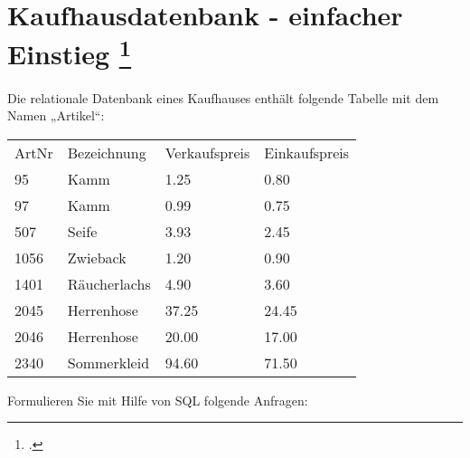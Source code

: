 \documentclass{lehramt-informatik-aufgabe}
\begin{document}
\section{Kaufhausdatenbank - einfacher Einstieg
\footcite{db:ab:2}
}

Die relationale Datenbank eines Kaufhauses enthält folgende Tabelle mit
dem Namen „Artikel“:

\begin{tabular}{llll}
ArtNr & Bezeichnung  & Verkaufspreis & Einkaufspreis \\
95    & Kamm         & 1.25          & 0.80          \\
97    & Kamm         & 0.99          & 0.75          \\
507   & Seife        & 3.93          & 2.45          \\
1056  & Zwieback     & 1.20          & 0.90          \\
1401  & Räucherlachs & 4.90          & 3.60          \\
2045  & Herrenhose   & 37.25         & 24.45         \\
2046  & Herrenhose   & 20.00         & 17.00         \\
2340  & Sommerkleid  & 94.60         & 71.50
\end{tabular}

Formulieren Sie mit Hilfe von SQL folgende Anfragen:
\end{document}
